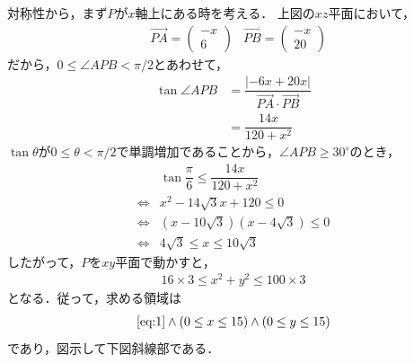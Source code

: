 \documentclass[../../main.tex]{subfiles}
\begin{document}
対称性から，まず$P$が$x$軸上にある時を考える．
上図の$xz$平面において，
\begin{align}
  &\overrightarrow{PA}=
  \begin{pmatrix}-x\\6
  \end{pmatrix}&\overrightarrow{PB}=
  \begin{pmatrix}-x\\20
  \end{pmatrix}
\end{align}
だから，$0\le\angle APB<\pi/2$とあわせて，
\begin{align}
  \tan\angle APB&=\dfrac{|-6x+20x|}{\overrightarrow{PA}\cdot\overrightarrow{PB}} \\
  &=\dfrac{14x}{120+x^2} \tag{$\because x\ge0$}
\end{align}
$\tan\theta$が$0\le\theta<\pi/2$で単調増加であることから，$\angle APB\ge30^\circ$のとき，
\begin{align}
  &\tan\dfrac{\pi}{6}\le\dfrac{14x}{120+x^2} \\
  \Longleftrightarrow &x^2-14\sqrt{3}x+120 \le 0 \\
  \Longleftrightarrow &(x-10\sqrt{3})(x-4\sqrt{3})\le 0  \\
  \Longleftrightarrow&4\sqrt{3}\le x\le 10\sqrt{3}
\end{align}
したがって，$P$を$xy$平面で動かすと，
\begin{align}
  16×3\le x^2+y^2\le100×3\label{eq:1}
\end{align}
となる．従って，求める領域は
\begin{align}
  \cref{eq:1}\land(0\le x\le15)\land(0\le y\le15)
\end{align}
であり，図示して下図斜線部である．
\end{document}
